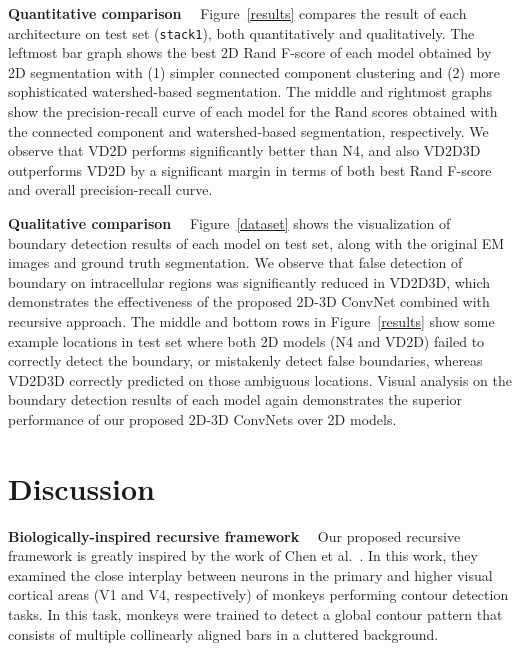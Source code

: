 \documentclass{article} %
\begin{document}
{\bf Quantitative comparison}$\quad$ Figure~\ref{results} compares the result of each architecture on test set (\texttt{stack1}), both quantitatively and qualitatively. The leftmost bar graph shows the best 2D Rand F-score of each model obtained by 2D segmentation with (1) simpler connected component clustering and (2) more sophisticated watershed-based segmentation. The middle and rightmost graphs show the precision-recall curve of each model for the Rand scores obtained with the connected component and watershed-based segmentation, respectively. We observe that VD2D performs significantly better than N4, and also VD2D3D outperforms VD2D by a significant margin in terms of both best Rand F-score and overall precision-recall curve.

{\bf Qualitative comparison}$\quad$
Figure~\ref{dataset} shows the visualization of boundary detection results of each model on test set, along with the original EM images and ground truth segmentation. We observe that false detection of boundary on intracellular regions was significantly reduced in VD2D3D, which demonstrates the effectiveness of the proposed 2D-3D ConvNet combined with recursive approach. The middle and bottom rows in Figure~\ref{results} show some example locations in test set where both 2D models (N4 and VD2D) failed to correctly detect the boundary, or mistakenly detect false boundaries, whereas VD2D3D correctly predicted on those ambiguous locations. Visual analysis on the boundary detection results of each model again demonstrates the superior performance of our proposed 2D-3D ConvNets over 2D models.


\section{Discussion}
\label{discussion}

{\bf Biologically-inspired recursive framework}$\quad$
Our proposed recursive framework is greatly inspired by the work of Chen et al.~\cite{Chen2014}. In this work, they examined the close interplay between neurons in the primary and higher visual cortical areas (V1 and V4, respectively) of monkeys performing contour detection tasks. In this task, monkeys were trained to detect a global contour pattern that consists of multiple collinearly aligned bars in a cluttered background.
\end{document}

